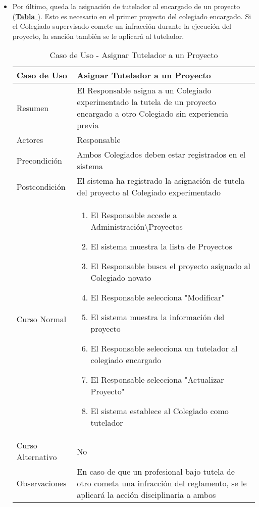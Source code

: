 \begin{itemize}
	\item \addtocounter{tabla}{1} Por último, queda la asignación de tutelador al encargado de un proyecto (\textbf{\hyperref[tab:curAsignarTutela]{Tabla }}). Esto es necesario en el primer proyecto del colegiado encargado. Si el Colegiado supervisado comete un infracción durante la ejecución del proyecto, la sanción también se le aplicará al tutelador.
		\begin{table}[!htbp]
		  \centering \addtocounter{casouso}{1}
		  \begin{tabular}{|l | p{100mm}|}
		    \textbf{Caso de Uso}  & \textbf{Asignar Tutelador a un Proyecto} \\ \hline
		    Resumen 		 & El Responsable asigna a un Colegiado experimentado la tutela de un proyecto encargado a otro Colegiado sin experiencia previa \\ \hline
		    Actores  		 & Responsable \\ \hline
		    Precondición  	 & Ambos Colegiados deben estar registrados en el sistema \\ \hline
		    Postcondición  	 & El sistema ha registrado la asignación de tutela del proyecto al Colegiado experimentado \\ \hline
		    Curso Normal   	 & \begin{enumerate}
			  \item El Responsable accede a Administración\textbackslash Proyectos
			  \item El sistema muestra la lista de Proyectos
			  \item El Responsable busca el proyecto asignado al Colegiado novato
			  \item El Responsable selecciona "Modificar"
			  \item El sistema muestra la información del proyecto
			  \item El Responsable selecciona un tutelador al colegiado encargado
			  \item El Responsable selecciona "Actualizar Proyecto"
			  \item El sistema establece al Colegiado como tutelador
		    \end{enumerate}  \\ \hline
		    Curso Alternativo  & No  \\ \hline
		    Observaciones 	 & En caso de que un profesional bajo tutela de otro cometa una infracción del reglamento, se le aplicará la acción disciplinaria a ambos  \\ \hline
		  \end{tabular}
		  \caption{Caso de Uso  - Asignar Tutelador a un Proyecto}
		  \label{tab:curAsignarTutela}
		\end{table}
		\FloatBarrier
\end{itemize}



